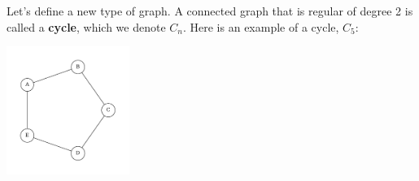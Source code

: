\begin{figure}[h]
{\begin{minipage}[c][1\width]{0.3\textwidth}
        \end{minipage}
    }
\end{figure} 

Let's define a new type of graph. A connected graph that is regular of degree 2 is called a \textbf{cycle}, which we denote $C_n$. Here is an example of a cycle, $C_5$:
\begin{center}
    \includegraphics[width=0.3\textwidth]{Chapter2/c5.pdf}
\end{center}

